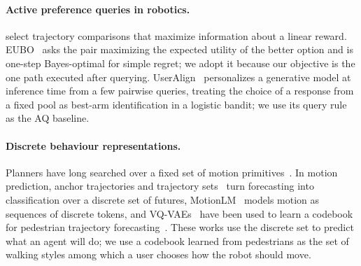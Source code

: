 \paragraph{Active preference queries in robotics.}
\citet{sadigh2017active} select trajectory comparisons that maximize information about a linear reward.
EUBO~\citep{astudillo2023qeubo} asks the pair maximizing the expected utility of the better option and is one-step Bayes-optimal for
simple regret; we adopt it because our objective is the one path executed after querying.
UserAlign~\citep{padurean2025useralign} personalizes a generative model at inference time from a few pairwise queries, treating
the choice of a response from a fixed pool as best-arm identification in a logistic bandit; we use its query rule as the AQ baseline.

\paragraph{Discrete behaviour representations.}
Planners have long searched over a fixed set of motion primitives~\citep{pivtoraiko2009lattice}. In motion prediction, anchor trajectories
\citep{chai2019multipath} and trajectory sets~\citep{phanminh2020covernet} turn forecasting into classification over a discrete set of
futures, MotionLM~\citep{seff2023motionlm} models motion as sequences of discrete tokens, and VQ-VAEs~\citep{vandenoord2017neural} have
been used to learn a codebook for pedestrian trajectory forecasting~\citep{benaglia2024lowrank}. These works use the discrete set to predict
what an agent will do; we use a codebook learned from pedestrians as the set of walking styles among which a user chooses how the robot
should move.
